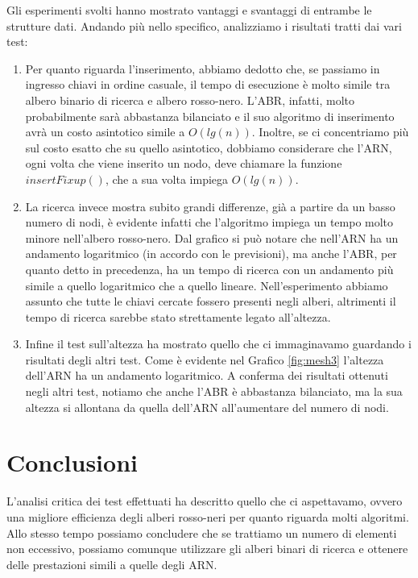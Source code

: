 \documentclass{article}
\begin{document}
Gli esperimenti svolti hanno mostrato vantaggi e svantaggi di entrambe le strutture dati. Andando più nello specifico, analizziamo i risultati tratti dai vari test:
\begin{enumerate}
\item Per quanto riguarda l'inserimento, abbiamo dedotto che, se passiamo in ingresso chiavi in ordine casuale, il tempo di esecuzione è molto simile tra albero binario di ricerca e albero rosso-nero. L'ABR, infatti, molto probabilmente sarà abbastanza bilanciato e il suo algoritmo di inserimento avrà un costo asintotico simile a $O(lg(n))$. Inoltre, se ci concentriamo più sul costo esatto che su quello asintotico, dobbiamo considerare che l'ARN, ogni volta che viene inserito un nodo, deve chiamare la funzione $insertFixup()$, che a sua volta impiega $O(lg(n))$.
\item La ricerca invece mostra subito grandi differenze, già a partire da un basso numero di nodi, è evidente infatti che l'algoritmo impiega un tempo molto minore nell'albero rosso-nero. Dal grafico si può notare che nell'ARN ha un andamento logaritmico (in accordo con le previsioni), ma anche l'ABR, per quanto detto in precedenza, ha un tempo di ricerca con un andamento più simile a quello logaritmico che a quello lineare.
Nell'esperimento abbiamo assunto che tutte le chiavi cercate fossero presenti negli alberi, altrimenti il tempo di ricerca sarebbe stato strettamente legato all'altezza.
\item Infine il test sull'altezza ha mostrato quello che ci immaginavamo guardando i risultati degli altri test. Come è evidente nel Grafico \ref{fig:mesh3} l'altezza dell'ARN ha un andamento logaritmico. A conferma dei risultati ottenuti negli altri test, notiamo che anche l'ABR è abbastanza bilanciato, ma la sua altezza si allontana da quella dell'ARN all'aumentare del numero di nodi.

\end{enumerate}

\section{Conclusioni}
L'analisi critica dei test effettuati ha descritto quello che ci aspettavamo, ovvero una migliore efficienza degli alberi rosso-neri per quanto riguarda molti algoritmi. Allo stesso tempo possiamo concludere che se trattiamo un numero di elementi non eccessivo, possiamo comunque utilizzare gli alberi binari di ricerca e ottenere delle prestazioni simili a quelle degli ARN.
\end{document}
